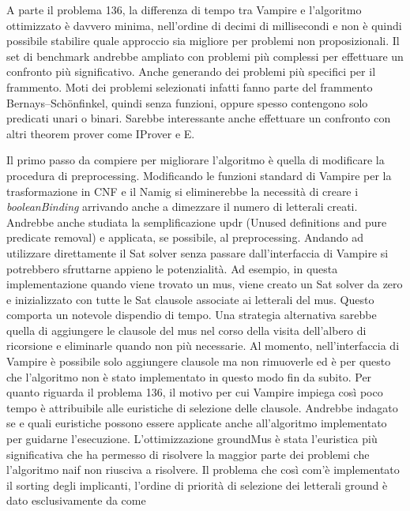 \documentclass[./main.tex]{subfiles}
\begin{document}
A parte il problema 136, la differenza di tempo tra Vampire e l'algoritmo ottimizzato è davvero minima, nell'ordine di 
decimi di millisecondi e non è quindi possibile stabilire quale approccio sia migliore per problemi non proposizionali.
Il set di benchmark andrebbe ampliato con problemi più complessi per effettuare un confronto più significativo.
Anche generando dei problemi più specifici per il frammento.
Moti dei problemi selezionati infatti fanno parte del frammento Bernays–Schönfinkel, quindi senza funzioni, oppure
spesso contengono solo predicati unari o binari.
Sarebbe interessante anche effettuare un confronto con altri theorem prover come IProver e E.

Il primo passo da compiere per migliorare l'algoritmo è quella di modificare la procedura di preprocessing.
Modificando le funzioni standard di Vampire per la trasformazione in CNF e il Namig si
eliminerebbe la necessità di creare i \textit{booleanBinding} arrivando anche a dimezzare il numero di letterali creati.
Andrebbe anche studiata la semplificazione updr (Unused definitions and pure predicate removal) e 
applicata, se possibile, al preprocessing.
Andando ad utilizzare direttamente il Sat solver senza passare dall'interfaccia di Vampire 
si potrebbero sfruttarne appieno le potenzialità. 
Ad esempio, in questa implementazione quando viene trovato un mus, viene creato un Sat solver da zero e inizializzato con tutte le Sat clausole associate ai letterali del mus.
Questo comporta un notevole dispendio di tempo. 
Una strategia alternativa sarebbe quella di aggiungere le clausole del mus nel corso della visita dell'albero di ricorsione 
e eliminarle quando non più necessarie. 
Al momento, nell'interfaccia di Vampire è possibile solo aggiungere clausole ma non rimuoverle ed 
è per questo che l'algoritmo non è stato implementato in questo modo fin da subito.
Per quanto riguarda il problema 136, il motivo per cui Vampire impiega così poco tempo 
è attribuibile alle euristiche di selezione delle clausole. 
Andrebbe indagato se e quali euristiche possono essere applicate anche all'algoritmo implementato per guidarne l'esecuzione.
L'ottimizzazione groundMus è stata l'euristica più significativa che ha permesso di risolvere la maggior parte dei problemi
che l'algoritmo naif non riusciva a risolvere.
Il problema che così com'è implementato il sorting degli implicanti, l'ordine di priorità di selezione dei letterali ground è dato esclusivamente da come 
\end{document}
